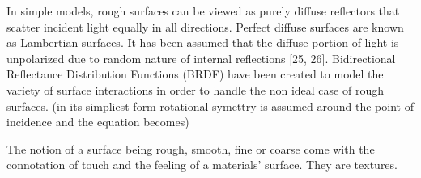 In simple models, rough surfaces can be viewed as purely diffuse reflectors that scatter incident light equally in all directions.  Perfect diffuse surfaces are known as Lambertian surfaces.  It has been assumed that the diffuse portion of light is unpolarized due to random nature of internal reflections [25, 26]. Bidirectional Reflectance Distribution Functions (BRDF) have been created to model the variety of surface interactions in order to handle the non ideal case of rough surfaces. (in its simpliest form rotational symettry is assumed around the point of incidence and the equation becomes)

The notion of a surface being rough, smooth, fine or coarse come with the connotation of touch and the feeling of a materials' surface.  They are textures.
